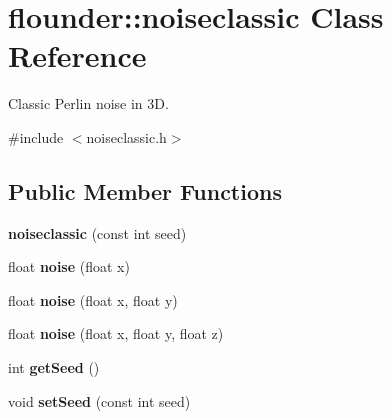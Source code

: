 \hypertarget{classflounder_1_1noiseclassic}{}\section{flounder\+:\+:noiseclassic Class Reference}
\label{classflounder_1_1noiseclassic}


Classic Perlin noise in 3D.  




{\ttfamily \#include $<$noiseclassic.\+h$>$}

\subsection*{Public Member Functions}
\begin{DoxyCompactItemize}
\item 
\mbox{\label{classflounder_1_1noiseclassic_a8652ce4926fa994fcb4fb70197cb8edd}} 
{\bfseries noiseclassic} (const int seed)
\item 
\mbox{\label{classflounder_1_1noiseclassic_a7d05ded3dca28de98791b9f97986c645}} 
float {\bfseries noise} (float x)
\item 
\mbox{\label{classflounder_1_1noiseclassic_aa2dbbf8fd7c2962bf0710470df95ed8b}} 
float {\bfseries noise} (float x, float y)
\item 
\mbox{\label{classflounder_1_1noiseclassic_a082d6549eacc7eabe398a612189c1349}} 
float {\bfseries noise} (float x, float y, float z)
\item 
\mbox{\label{classflounder_1_1noiseclassic_abadd54738311d67a47e5fa73ccb83724}} 
int {\bfseries get\+Seed} ()
\item 
\mbox{\label{classflounder_1_1noiseclassic_a264cf8388bd9f507740fb58c122b0b42}} 
void {\bfseries set\+Seed} (const int seed)
\end{DoxyCompactItemize}
